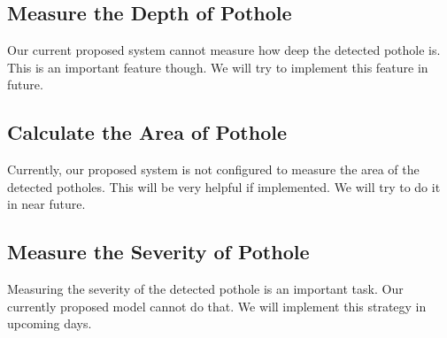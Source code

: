         \subsection{Measure the Depth of Pothole}
            Our current proposed system cannot measure how deep the detected pothole is. This is an important feature though. We will try to implement this feature in future.
            
        \subsection{Calculate the Area of Pothole}
            Currently, our proposed system is not configured to measure the area of the detected potholes. This will be very helpful if implemented.
            We will try to do it in near future.
            
        \subsection{Measure the Severity of Pothole}
            Measuring the severity of the detected pothole is an important task. Our currently proposed model cannot do that. We will implement this strategy in upcoming days. 
            
